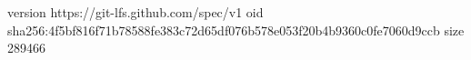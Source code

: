 version https://git-lfs.github.com/spec/v1
oid sha256:4f5bf816f71b78588fe383c72d65df076b578e053f20b4b9360c0fe7060d9ccb
size 289466
